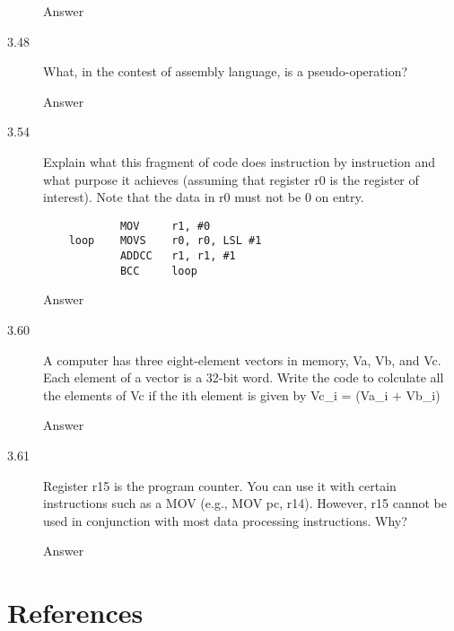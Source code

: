 \documentclass[letterpaper,10pt,titlepage]{article}
\begin{document}
\begin{description}
    Answer
    \item[3.48] What, in the contest of assembly language, is a pseudo-operation?
    
    Answer
    \item[3.54] Explain what this fragment of code does instruction by instruction and what purpose it achieves (assuming that register r0 is the register of interest). Note that the data in r0 must not be 0 on entry.
    \begin{lstlisting}
            MOV     r1, #0
    loop    MOVS    r0, r0, LSL #1
            ADDCC   r1, r1, #1
            BCC     loop
    \end{lstlisting}
    
    Answer
    \item[3.60] A computer has three eight-element vectors in memory, Va, Vb, and Vc. Each element of a vector is a 32-bit word. Write the code to colculate all the elements of Vc if the ith element is given by Vc_i = (Va_i $+$ Vb_i)
    
    Answer
    \item[3.61] Register r15 is the program counter. You can use it with certain instructions such as a MOV (e.g., MOV  pc, r14). However, r15 cannot be used in conjunction with most data processing instructions. Why?
    
    Answer
\end{description}

\newpage
\section*{References}
\end{document}
